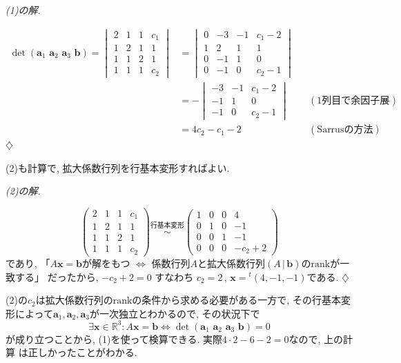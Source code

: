 \documentclass[titlepage]{jsarticle}
\numberwithin{equation}{section}
\newcommand{\R}{\mathbb{R}}%
\newenvironment{kaitou}[1][解]{%
\begin{proofbox}%
\textit{#1. }\ignorespaces
}{%
\hfill$\diamondsuit$%
\end{proofbox}%
}
\begin{document}
\begin{kaitou}[(1)の解]
\begin{align*}
\det(\bm{a}_1 \,\, \bm{a}_2 \,\, \bm{a}_3 \,\, \bm{b}) = 
\begin{vmatrix}
2 & 1 & 1 & c_1\\
1 & 2 & 1 & 1\\
1 & 1 & 2 & 1\\
1 & 1 & 1 & c_2
\end{vmatrix}
&=
\begin{vmatrix}
0 & -3 & -1 & c_1 - 2\\
1 & 2 & 1 & 1\\
0 & -1 & 1 & 0\\
0 & -1 & 0 & c_2 - 1
\end{vmatrix}\\
&=
-
\begin{vmatrix}
-3 & -1 & c_1 - 2\\
-1 & 1 & 0\\
-1 & 0 & c_2 - 1
\end{vmatrix}
&&(\text{1列目で余因子展開})\\
&= \boxed{4c_2 - c_1 - 2}&&(\text{Sarrus}の方法)
\end{align*}
\end{kaitou}
(2)も計算で, 拡大係数行列を行基本変形すればよい.
\begin{kaitou}[(2)の解]
\[
\left(
\begin{array}{ccc|c}
2 & 1 & 1 & c_1\\
1 & 2 & 1 & 1\\
1 & 1 & 2 & 1\\
1 & 1 & 1 & c_2
\end{array}
\right)
\stackrel{\text{行基本変形}}{\sim}
\left(
\begin{array}{ccc|c}
1 & 0 & 0 & 4\\
0 & 1 & 0 & -1\\
0 & 0 & 1 & -1\\
0 & 0 & 0 & -c_2 +2
\end{array}
\right)
\]
であり, 「$A\bm{x} = \bm{b}$が解をもつ $\iff$ 係数行列$A$と拡大係数行列$(A\,|\, \bm{b})$の$\mathrm{rank}$が一致する」 だったから, $-c_2 + 2 = 0$ すなわち $c_2 = \boxed{2}$\,,\,\,$\bm{x} = \boxed{{}^t(4, -1, -1)}$である.
\end{kaitou}
(2)の$c_2$は拡大係数行列の$\mathrm{rank}$の条件から求める必要がある一方で, その行基本変形によって$\bm{a}_1, \bm{a}_2, \bm{a}_3$が一次独立とわかるので, その状況下で
\[
\exists \bm{x} \in \R^3 : A\bm{x}=\bm{b} \iff \det(\bm{a}_1\,\,\bm{a}_2\,\,\bm{a}_3\,\,\bm{b}) = 0
\]
が成り立つことから, (1)を使って検算できる. 実際$4\cdot 2 - 6 - 2 = 0$なので, 上の計算
は正しかったことがわかる.
\end{document}
